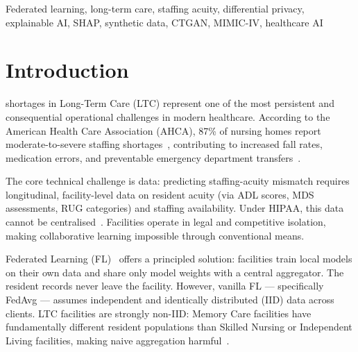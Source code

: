 \documentclass[journal]{IEEEtran}
\begin{document}
\begin{abstract}
no-DP baseline; tighter budgets ($\varepsilon \leq 5$) degrade utility by
$> 21\%$, motivating larger models or tree-level DP for stricter requirements.
The four-dimension XAI Audit Scorecard, computed from real SHAP values, exposes
a decisive fairness result: the single global model that FedAvg must deploy
collapses toward one care type and under-detects Memory Care mismatch
(true-positive rate 0.22), whereas Clustered FL preserves balanced detection
across all three subgroups (equalized-odds gap 0.18 vs.\ 0.39 for FedAvg),
while every variant draws its top-5 features exclusively from clinically-%
established staffing determinants. FedAcuity
provides the first privacy-preserving, explainable cross-facility mismatch
prediction system for Long-Term Care.
\end{abstract}

\begin{IEEEkeywords}
Federated learning, long-term care, staffing acuity, differential privacy,
explainable AI, SHAP, synthetic data, CTGAN, MIMIC-IV, healthcare AI
\end{IEEEkeywords}

\section{Introduction}
\label{sec:intro}

 shortages in Long-Term Care (LTC) represent one of
the most persistent and consequential operational challenges in modern
healthcare. According to the American Health Care Association (AHCA), 87\% of
nursing homes report moderate-to-severe staffing shortages~\cite{ahca2022},
contributing to increased fall rates, medication errors, and preventable
emergency department transfers~\cite{harrington2020}.

The core technical challenge is data: predicting staffing-acuity mismatch
requires longitudinal, facility-level data on resident acuity (via ADL scores,
MDS assessments, RUG categories) and staffing availability. Under HIPAA, this
data cannot be centralised~\cite{hipaa1996}. Facilities operate in legal and
competitive isolation, making collaborative learning impossible through
conventional means.

Federated Learning (FL)~\cite{mcmahan2017} offers a principled solution:
facilities train local models on their own data and share only model weights
with a central aggregator. The resident records never leave the facility.
However, vanilla FL — specifically FedAvg — assumes independent and identically
distributed (IID) data across clients. LTC facilities are strongly non-IID:
Memory Care facilities have fundamentally different resident populations than
Skilled Nursing or Independent Living facilities, making naive aggregation
harmful~\cite{li2022federated}.
\end{document}
